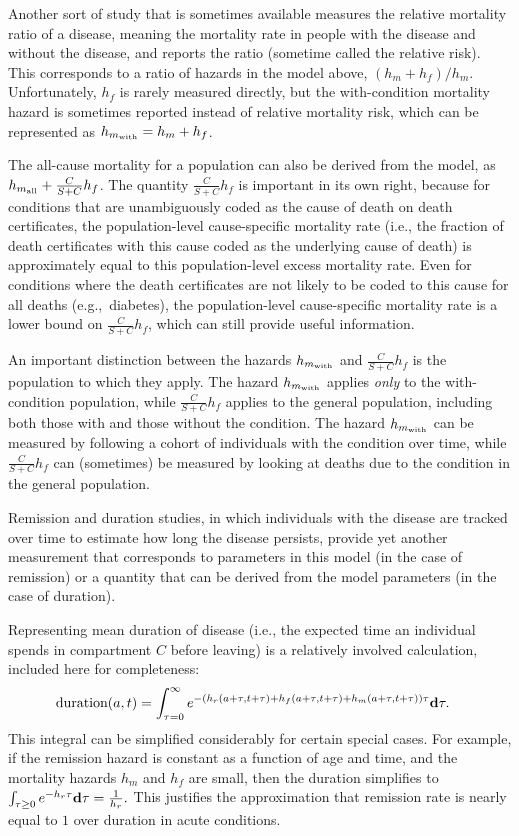 Another sort of study that is sometimes available
measures the relative mortality ratio of a disease, meaning the
mortality rate in people with the disease and without the disease, and
reports the ratio (sometime called the relative risk).  This
corresponds to a ratio of hazards in the model above, $(h_m+h_f) /
h_m$.  Unfortunately, $h_f$ is rarely measured directly, but the
with-condition mortality hazard is sometimes reported instead of
relative mortality risk, which can be represented as $h_{m_{\text{with}}} =
h_m+h_f$.

The all-cause mortality for a population can also be
derived from the model, as $h_{m_{\text{all}}} + \frac{C}{S+C}h_f$.  The quantity
$\frac{C}{S+C}h_f$ is important in its own right, because for
conditions that are unambiguously coded as the cause of death on death
certificates, the population-level cause-specific mortality rate
(i.e., the fraction of death certificates with this cause coded as the
underlying cause of death) is approximately equal to this
population-level excess mortality rate.  Even for conditions
where the death certificates are not likely to be coded to this cause
for all deaths (e.g.,~diabetes), the population-level cause-specific
mortality rate is a lower bound on $\frac{C}{S+C}h_f$, which can still
provide useful information.

An important distinction between the hazards $h_{m_{\text{with}}}$
and $\frac{C}{S+C}h_f$ is the population to which they
apply. The hazard $h_{m_{\text{with}}}$ applies \emph{only} to the with-condition
population, while $\frac{C}{S+C}h_f$ applies to the general
population, including both those with and those without the condition.  The hazard
$h_{m_{\text{with}}}$ can be measured by following a cohort of individuals
with the condition over time, while $\frac{C}{S+C}h_f$ can (sometimes)
be measured by looking at deaths due to the condition in the general
population.

Remission and duration studies, in which individuals with the disease are
tracked over time to estimate how long the disease persists, provide
yet another measurement that corresponds to parameters in this model
(in the case of remission) or a quantity that can be derived from the
model parameters (in the case of duration).

Representing mean duration of disease (i.e., the expected time an
individual spends in compartment $C$ before leaving) is a relatively
involved calculation, included here for completeness:
\begin{align*}
\text{duration}(a, t) &
= \int_{\tau = 0}^\infty e^{-\left(h_r(a+\tau, t+\tau) + h_f(a+\tau, t+\tau) + h_m(a+\tau, t+\tau)\right) \tau}\mathbf{d} \tau.
\end{align*}
This integral can be simplified considerably for certain special
cases.  For example, if the remission hazard is constant as a function
of age and time, and the mortality hazards $h_m$ and $h_f$ are small, then the duration
simplifies to $\int_{\tau \geq 0} e^{-h_r\tau}\mathbf{d} \tau =
\frac{1}{h_r}.$ This justifies the approximation that remission rate is
nearly equal to $1$ over duration in acute conditions.

